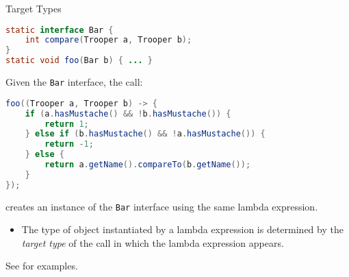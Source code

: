 \documentclass{beamer}
\begin{document}
\begin{frame}[fragile]{Target Types}
\vspace{-.05in}
\begin{lstlisting}[language=Java]
static interface Bar {
    int compare(Trooper a, Trooper b);
}
static void foo(Bar b) { ... }
\end{lstlisting}
\vspace{-.05in}
Given the {\tt Bar} interface, the call:
\vspace{-.05in}
\begin{lstlisting}[language=Java]
foo((Trooper a, Trooper b) -> {
    if (a.hasMustache() && !b.hasMustache()) {
        return 1;
    } else if (b.hasMustache() && !a.hasMustache()) {
        return -1;
    } else {
        return a.getName().compareTo(b.getName());
    }
});
\end{lstlisting}
\vspace{-.05in}
creates an instance of the {\tt Bar} interface using the same lambda expression.
\vspace{-.05in}
\begin{itemize}
\item The type of object instantiated by a lambda expression is determined by the {\it target type} of the call in which the lambda expression appears.
\end{itemize}

See  for examples.

\end{frame}
\end{document}
